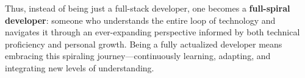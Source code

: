 \documentclass[../../main.tex]{subfiles}
\begin{document}
    Thus, instead of being just a full-stack developer, one becomes a \textbf{full-spiral developer}: someone who understands the entire loop of technology and navigates it through an ever-expanding perspective informed by both technical proficiency and personal growth. Being a fully actualized developer means embracing this spiraling journey—continuously learning, adapting, and integrating new levels of understanding.

\end{document}
